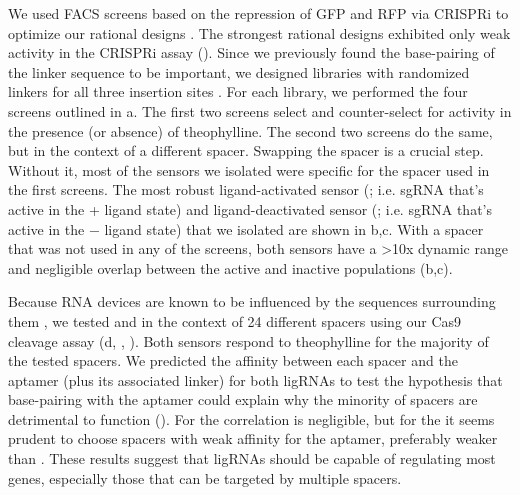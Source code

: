 \documentclass[10pt,oneside]{article}
\begin{document}

We used FACS screens based on the repression of GFP and RFP via CRISPRi to optimize our rational designs \invivo{}.  The strongest rational designs exhibited only weak activity in the CRISPRi assay ().  Since we previously found the base-pairing of the linker sequence to be important, we designed libraries with randomized linkers for all three insertion sites .  For each library, we performed the four screens outlined in a.  The first two screens select and counter-select for activity in the presence (or absence) of theophylline.  The second two screens do the same, but in the context of a different spacer.  Swapping the spacer is a crucial step.  Without it, most of the sensors we isolated were specific for the spacer used in the first screens.  The most robust ligand-activated sensor (\ligrnaF{}; i.e. sgRNA that's active in the + ligand state) and ligand-deactivated sensor (\ligrnaB{}; i.e. sgRNA that's active in the − ligand state) that we isolated are shown in b,c.  With a spacer that was not used in any of the screens, both sensors have a >10x dynamic range and negligible overlap between the active and inactive populations (b,c).
% 
% 

% 
% 
% 
% 
% 
%
Because RNA devices are known to be influenced by the sequences surrounding them \autocite{liang2012}, we tested \ligrnaF{} and \ligrnaB{} in the context of 24 different spacers using our \invitro{} Cas9 cleavage assay (d, , ).  Both sensors respond to theophylline for the majority of the tested spacers.  We predicted the affinity between each spacer and the aptamer (plus its associated linker) for both ligRNAs to test the hypothesis that base-pairing with the aptamer could explain why the minority of spacers are detrimental to function ().  For \ligrnaF{} the correlation is negligible, but for the \ligrnaB{} it seems prudent to choose spacers with weak affinity for the aptamer, preferably weaker than .  These results suggest that ligRNAs should be capable of regulating most genes, especially those that can be targeted by multiple spacers.
\end{document}
